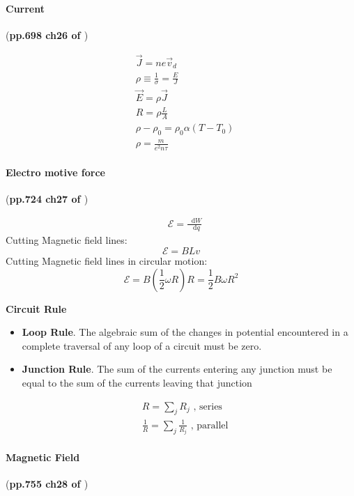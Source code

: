 \documentclass{article}
\newcommand*\diff{\mathop{}\!\mathrm{d}}
\numberwithin{equation}{subsection} %
\theoremstyle{definition}
\begin{document}
\paragraph{Current} (\textbf{pp.698 ch26 of \cite{book}})

\begin{align}
    & \vec{J} = ne \vec{v}_d \\
    & \rho \equiv \frac{1}{\sigma} = \frac{E}{J} \\
    & \vec{E} = \rho \vec{J} \\
    & R = \rho \frac{L}{A} \\
    & \rho - \rho_0 = \rho_0 \alpha (T-T_0) \\
    & \rho = \frac{m}{e^2 n\tau }
\end{align}

\paragraph{Electro motive force} (\textbf{pp.724 ch27 of \cite{book}})

\begin{align}
    & \mathcal{E} = \frac{\diff W}{\diff q}
\end{align}
Cutting Magnetic field lines:
\begin{equation}
    \mathcal{E} = BLv 
\end{equation}
Cutting Magnetic field lines in circular motion:
\begin{equation}
    \mathcal{E} = B(\frac{1}{2}\omega R) R = \frac{1}{2}B\omega R^2
\end{equation}

\textbf{Circuit Rule}
\begin{itemize}
    \item \textbf{Loop Rule}. The algebraic sum of the changes in
        potential encountered in a complete traversal of any loop of a
        circuit must be zero.
    \item \textbf{Junction Rule}. The sum of the currents entering any
        junction must be equal to the sum of the currents leaving that
        junction
\end{itemize}

\begin{align}
    & R = \sum_j R_j \text{ , series} \\
    & \frac{1}{R} = \sum_j \frac{1}{R_j} \text{ , parallel}
\end{align}

\paragraph{Magnetic Field} (\textbf{pp.755 ch28 of \cite{book}})
\end{document}
